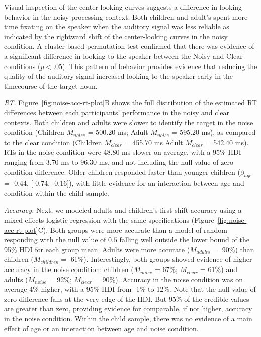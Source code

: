 \documentclass[,man,floatsintext]{apa6}
\begin{document}
Visual inspection of the center looking curves suggests a difference in
looking behavior in the noisy processing context. Both children and
adult's spent more time fixating on the speaker when the auditory signal
was less reliable as indicated by the rightward shift of the
center-looking curves in the noisy condition. A cluster-based
permutation test confirmed that there was evidence of a significant
difference in looking to the speaker between the Noisy and Clear
conditions (\(p < .05\)). This pattern of behavior provides evidence
that reducing the quality of the auditory signal increased looking to
the speaker early in the timecourse of the target noun.

\emph{RT.} Figure~\ref{fig:noise-acc-rt-plot}B shows the full
distribution of the estimated RT differences between each participants'
performance in the noisy and clear contexts. Both children and adults
were slower to identify the target in the noise condition (Children
\(M_{noise}\) = 500.20 ms; Adult \(M_{noise}\) = 595.20 ms), as compared
to the clear condition (Children \(M_{clear}\) = 455.70 ms Adult
\(M_{clear}\) = 542.40 ms). RTs in the noise condition were 48.80 ms
slower on average, with a 95\% HDI ranging from 3.70 ms to 96.30 ms, and
not including the null value of zero condition difference. Older
children responded faster than younger children (\(\beta_{age}\) =
-0.44, {[}-0.74, -0.16{]}), with little evidence for an interaction
between age and condition within the child sample.

\emph{Accuracy.} Next, we modeled adults and children's first shift
accuracy using a mixed-effects logistic regression with the same
specifications (Figure~\ref{fig:noise-acc-rt-plot}C). Both groups were
more accurate than a model of random responding with the null value of
\(0.5\) falling well outside the lower bound of the 95\% HDI for each
group mean. Adults were more accurate (\(M_{adults} =\) 90\%) than
children (\(M_{children} =\) 61\%). Interestingly, both groups showed
evidence of higher accuracy in the noise condition: children
(\(M_{noise}\) = 67\%; \(M_{clear}\) = 61\%) and adults (\(M_{noise}\) =
92\%; \(M_{clear}\) = 90\%). Accuracy in the noise condition was on
average 4\% higher, with a 95\% HDI from -1\% to 12\%. Note that the
null value of zero difference falls at the very edge of the HDI. But
95\% of the credible values are greater than zero, providing evidence
for comparable, if not higher, accuracy in the noise condition. Within
the child sample, there was no evidence of a main effect of age or an
interaction between age and noise condition.
\end{document}
